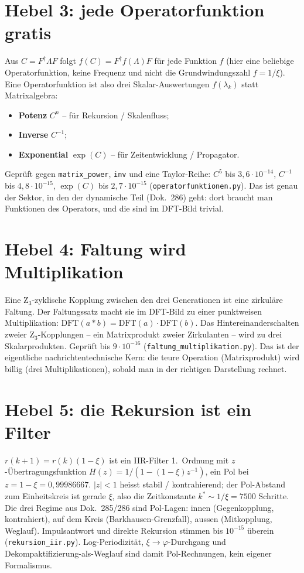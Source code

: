 \section{Hebel 3: jede Operatorfunktion gratis}
Aus $C=F^{\dagger}\Lambda F$ folgt $f(C)=F^{\dagger}f(\Lambda)F$ für jede Funktion $f$ (hier eine beliebige
Operatorfunktion, keine Frequenz und nicht die Grundwindungszahl $f=1/\xi$). Eine
Operatorfunktion ist also drei Skalar-Auswertungen $f(\lambda_k)$ statt Matrixalgebra:
\begin{itemize}
  \item \textbf{Potenz} $C^n$ -- für Rekursion / Skalenfluss;
  \item \textbf{Inverse} $C^{-1}$;
  \item \textbf{Exponential} $\exp(C)$ -- für Zeitentwicklung / Propagator.
\end{itemize}
Geprüft gegen \texttt{matrix\_power}, \texttt{inv} und eine Taylor-Reihe: $C^5$ bis
$3{,}6\cdot10^{-14}$, $C^{-1}$ bis $4{,}8\cdot10^{-15}$, $\exp(C)$ bis $2{,}7\cdot10^{-15}$
(\texttt{operatorfunktionen.py}). Das ist genau der Sektor, in den der dynamische Teil (Dok.~286)
geht: dort braucht man Funktionen des Operators, und die sind im DFT-Bild trivial.

\section{Hebel 4: Faltung wird Multiplikation}
Eine Z$_3$-zyklische Kopplung zwischen den drei Generationen ist eine zirkuläre Faltung. Der
Faltungssatz macht sie im DFT-Bild zu einer punktweisen Multiplikation:
$\mathrm{DFT}(a\ast b)=\mathrm{DFT}(a)\cdot\mathrm{DFT}(b)$. Das Hintereinanderschalten zweier
Z$_3$-Kopplungen -- ein Matrixprodukt zweier Zirkulanten -- wird zu drei Skalarprodukten. Geprüft
bis $9\cdot10^{-16}$ (\texttt{faltung\_multiplikation.py}). Das ist der eigentliche
nachrichtentechnische Kern: die teure Operation (Matrixprodukt) wird billig (drei Multiplikationen),
sobald man in der richtigen Darstellung rechnet.

\section{Hebel 5: die Rekursion ist ein Filter}
$r(k{+}1)=r(k)(1-\xi)$ ist ein IIR-Filter 1.~Ordnung mit $z$-Übertragungsfunktion
$H(z)=1/(1-(1-\xi)z^{-1})$, ein Pol bei $z=1-\xi=0{,}99986667$. $|z|<1$ heisst stabil /
kontrahierend; der Pol-Abstand zum Einheitskreis ist gerade $\xi$, also die Zeitkonstante
$k^{*}\sim1/\xi=7500$ Schritte. Die drei Regime aus Dok.~285/286 sind Pol-Lagen: innen (Gegenkopplung,
kontrahiert), auf dem Kreis (Barkhausen-Grenzfall), aussen (Mitkopplung, Weglauf). Impulsantwort und
direkte Rekursion stimmen bis $10^{-15}$ überein (\texttt{rekursion\_iir.py}). Log-Periodizität,
$\xi\!\to\!\varphi$-Durchgang und Dekompaktifizierung-als-Weglauf sind damit Pol-Rechnungen, kein
eigener Formalismus.

